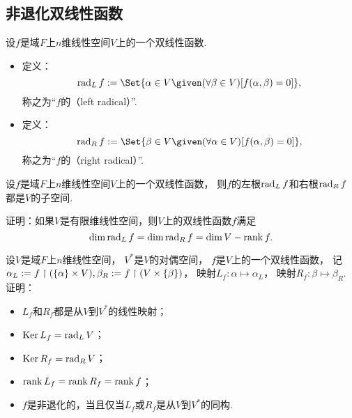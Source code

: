 \subsection{非退化双线性函数}
\begin{definition}
设\(f\)是域\(F\)上\(n\)维线性空间\(V\)上的一个双线性函数.
\begin{itemize}
	\item 定义：\begin{equation}
		\Rad_L f
		\defeq
		\Set{
			\alpha \in V
			\given
			(\forall\beta \in V)
			[f(\alpha,\beta) = 0]
		},
	\end{equation}
	称之为“\(f\)的（left radical）”.
	\item 定义：\begin{equation}
		\Rad_R f
		\defeq
		\Set{
			\beta \in V
			\given
			(\forall\alpha \in V)
			[f(\alpha,\beta) = 0]
		},
	\end{equation}
	称之为“\(f\)的（right radical）”.
\end{itemize}
\end{definition}

\begin{proposition}
设\(f\)是域\(F\)上\(n\)维线性空间\(V\)上的一个双线性函数，
则\(f\)的左根\(\operatorname{rad}_L f\)和右根\(\operatorname{rad}_R f\)都是\(V\)的子空间.
\end{proposition}

\begin{example}
证明：如果\(V\)是有限维线性空间，则\(V\)上的双线性函数\(f\)满足\begin{equation*}
	\dim\operatorname{rad}_L f
	= \dim\operatorname{rad}_R f
	= \dim V - \rank f.
\end{equation*}
\end{example}

\begin{example}
\def\fL{\alpha_L}  %
\def\fR{\beta_R}  %
\def\Lf{L_f}  %
\def\Rf{R_f}  %
设\(V\)是域\(F\)上\(n\)维线性空间，
\(V^*\)是\(V\)的对偶空间，
\(f\)是\(V\)上的一个双线性函数，
记\(\alpha_L := f \upharpoonright (\{\alpha\} \times V),
\beta_R := f \upharpoonright (V \times \{\beta\})\)，
映射\(\Lf\colon \alpha \mapsto \fL\)，
映射\(\Rf\colon \beta \mapsto \fR\).
证明：\begin{itemize}
	\item \(\Lf\)和\(\Rf\)都是从\(V\)到\(V^*\)的线性映射；
	\item \(\Ker \Lf = \Rad_L V\)；
	\item \(\Ker \Rf = \Rad_R V\)；
	\item \(\rank \Lf = \rank \Rf = \rank f\)；
	\item \(f\)是非退化的，当且仅当\(\Lf\)或\(\Rf\)是从\(V\)到\(V^*\)的同构.
\end{itemize}
\end{example}

